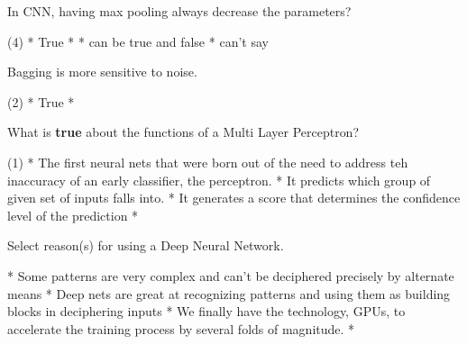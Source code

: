 \documentclass[10pt]{extarticle}
\begin{document}
\begin{exercise}
    In CNN, having max pooling always decrease the parameters?
    \begin{choice} (4)
        * True
        * 
        * can be true and false
        * can't say
    \end{choice}
\end{exercise}
\begin{solution}
\end{solution}

\begin{exercise}
    Bagging is more sensitive to noise.
    \begin{choice} (2)
        * True
        * 
    \end{choice}
\end{exercise}
\begin{solution}
\end{solution}

\begin{exercise}
    What is \textbf{true} about the functions of a Multi Layer Perceptron?
    \begin{choice} (1)
        * The first neural nets that were born out of the need to address teh inaccuracy of an early classifier, the perceptron.
        * It predicts which group of given set of inputs falls into.
        * It generates a score that determines the confidence level of the prediction
        * 
    \end{choice}
\end{exercise}
\begin{solution}
\end{solution}

\begin{exercise}
    Select reason(s) for using a Deep Neural Network.
    \begin{choice}
        * Some patterns are very complex and can't be deciphered precisely by alternate means
        * Deep nets are great at recognizing patterns and using them as building blocks in deciphering inputs
        * We finally have the technology, GPUs, to accelerate the training process by several folds of magnitude.
        * 
    \end{choice}
\end{exercise}
\begin{solution}
\end{solution}
\end{document}
